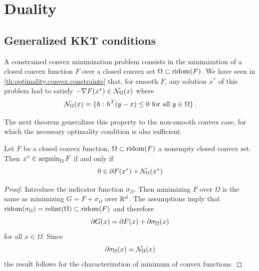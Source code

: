 \section{Duality}
\label{sec:convex.optim}


\subsection{Generalized KKT conditions}
A constrained convex minimization problem consists in the minimization of a closed convex function $F$ over a closed convex set $\Omega\subset \mathrm{ridom}(F)$. We have seen in \cref{th:optimality.convex.constraints} that, for smooth $F$, any solution $x^*$ of this problem had to satisfy $-\nabla F(x^*) \in {\mathcal N}_\Omega(x)$ where
\[
{\mathcal N}_\Omega(x) = \{h: h^T(y-x) \leq 0 \text{ for all } y\in\Omega\}\,.
\]

The next theorem generalizes this property to the non-smooth convex case, for which the necessary optimality condition is also sufficient.
\begin{theorem}
\label{th:optimality.convex.constraints.non-smooth}
Let $F$ be a closed convex function, $\Omega\subset \mathrm{ridom}(F)$ a nonempty closed convex set. Then $x^* \in \operatorname*{argmin}_\Omega F$ if and only if
\[
0 \in \partial F(x^*) + {\mathcal N}_\Omega(x^*)
\]
\end{theorem}
\begin{proof}
Introduce the indicator function $\sigma_\Omega$. Then minimizing $F$ over $\Omega$ is the same as minimizing $G = F + \sigma_\Omega$ over ${\mathbb{R}}^d$. The assumptions imply that $\mathrm{ridom}(\sigma_\Omega) = \mathrm{relint}(\Omega) \subset \mathrm{ridom}(F)$ and therefore
\[
\partial G(x) = \partial F(x) + \partial \sigma_\Omega(x)
\]
for all $x\in \Omega$. Since
\[
\partial \sigma_\Omega(x) = {\mathcal N}_\Omega(x)
\]
the result follows for the characterization of minimum of convex functions. 
\end{proof}

